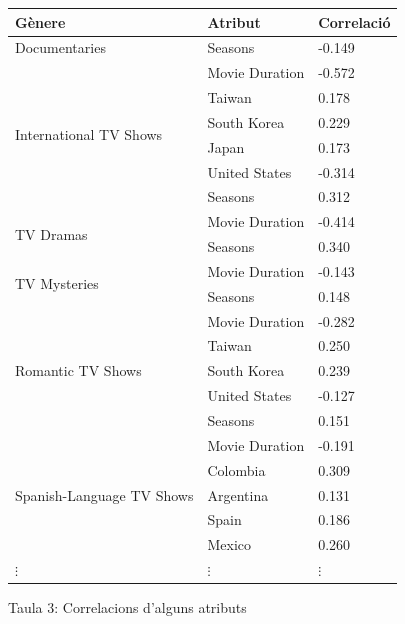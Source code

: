 \documentclass[a4paper, 11pt]{article}
\begin{document}
\begin{figure}[h] %
\begin{minipage}{10cm} %
\begin{center}
    \begin{tabular}{l|l|l}
        \textbf{Gènere} & \textbf{Atribut} & \textbf{Correlació}\\\hline\hline
        Documentaries & Seasons & -0.149\\\hline
            \multirow{6}{*}{ International TV Shows} &  Movie Duration  & -0.572 \\
        &Taiwan       &     0.178 \\
        &South Korea   &    0.229 \\
        &Japan        &     0.173 \\
        &United States  &  -0.314 \\
        &Seasons      &     0.312 \\\hline
        \multirow{2}{*}{TV Dramas} & Movie Duration  & -0.414 \\
        & Seasons     &      0.340\\\hline
        \multirow{2}{*}{TV Mysteries} & Movie Duration &   -0.143 \\
 & Seasons       &    0.148\\\hline
        \multirow{5}{*}{Romantic TV Shows} & Movie Duration &   -0.282 \\
& Taiwan        &     0.250 \\
& South Korea   &    0.239 \\
& United States  &  -0.127 \\
& Seasons      &     0.151 \\\hline
        \multirow{5}{*}{Spanish-Language TV Shows} & Movie Duration &  -0.191 \\
& Colombia      &    0.309 \\
& Argentina    &     0.131 \\
& Spain      &       0.186 \\
& Mexico      &      0.260\\\hline
         $\vdots$ & $\vdots$ & $\vdots$
    \end{tabular}
    \label{tab:afins}
    Taula 3: Correlacions d'alguns atributs    \setcounter{table}{3}
\end{center}



\end{minipage}
\end{figure}
\end{document}
